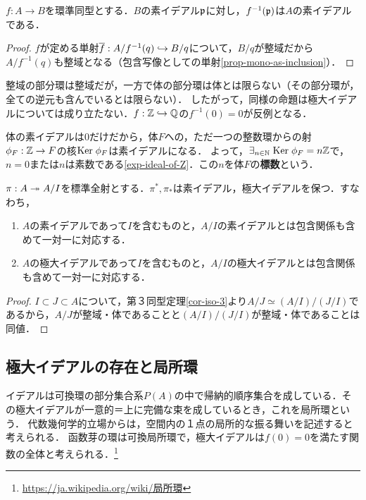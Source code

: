 \documentclass[uplatex,dvipdfmx]{jsreport}
\begin{document}
\begin{proposition}[逆像関手は素イデアルを保つ]\label{prop-preimage-of-prime-ideal-is-prime}
    $f:A\to B$を環準同型とする．$B$の素イデアル$\mathfrak{p}$に対し，$f^{-1}(\mathfrak{p})$は$A$の素イデアルである．
\end{proposition}
\begin{proof}
    $f$が定める単射$\overline{f}:A/f^{-1}(q)\hookrightarrow B/q$について，$B/q$が整域だから$A/f^{-1}(q)$も整域となる（包含写像としての単射\ref{prop-mono-as-inclusion}）．
\end{proof}
\begin{remark}
    整域の部分環は整域だが，一方で体の部分環は体とは限らない（その部分環が，全ての逆元も含んでいるとは限らない）．
    したがって，同様の命題は極大イデアルについては成り立たない．$f:\mathbb{Z}\hookrightarrow\mathbb{Q}$の$f^{-1}(0)=0$が反例となる．
\end{remark}
\begin{example}[characteristic]
    体の素イデアルは$0$だけだから，体$F$への，ただ一つの整数環からの射$\phi_F:\mathbb{Z}\to F$の核$\mathrm{Ker}\;\phi_F$は素イデアルになる．
    よって，$\exists_{n\in\mathbb{N}}\;\mathrm{Ker}\;\phi_F=n\mathbb{Z}$で，$n=0$または$n$は素数である\ref{exp-ideal-of-Z}．この$n$を体$F$の\textbf{標数}という．
\end{example}

\begin{proposition}\label{prop-correspondence-of-prime-and-maximal-ideals}
    $\pi:A\twoheadrightarrow A/I$を標準全射とする．$\pi^*,\pi_*$は素イデアル，極大イデアルを保つ．すなわち，
    \begin{enumerate}
        \item $A$の素イデアルであって$I$を含むものと，$A/I$の素イデアルとは包含関係も含めて一対一に対応する．
        \item $A$の極大イデアルであって$I$を含むものと，$A/I$の極大イデアルとは包含関係も含めて一対一に対応する．
    \end{enumerate}
\end{proposition}
\begin{proof}
    $I\subset J\subset A$について，第３同型定理\ref{cor-iso-3}より$A/J\simeq(A/I)/(J/I)$であるから，$A/J$が整域・体であることと$(A/I)/(J/I)$が整域・体であることは同値．
\end{proof}

\subsection{極大イデアルの存在と局所環}

\begin{tcolorbox}[colframe=ForestGreen, colback=ForestGreen!10!white,breakable,colbacktitle=ForestGreen!40!white,coltitle=black,fonttitle=\bfseries\sffamily,
title=]
    イデアルは可換環の部分集合系$P(A)$の中で帰納的順序集合を成している．その極大イデアルが一意的＝上に完備な束を成しているとき，これを局所環という．
    代数幾何学的立場からは，空間内の１点の局所的な振る舞いを記述すると考えられる．
    函数芽の環は可換局所環で，極大イデアルは$f(0)=0$を満たす関数の全体と考えられる．\footnote{\url{https://ja.wikipedia.org/wiki/局所環}}
\end{tcolorbox}
\end{document}
